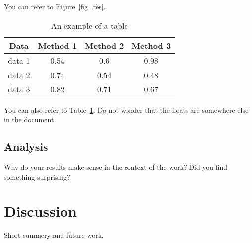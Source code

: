 \documentclass[a4paper,12pt]{article}
\begin{document}
You can refer to Figure~\ref{fig_res}.
\begin{table}[h]
\caption{An example of a table}
\label{tab_example}
\centering
\begin{tabular}{c||c|c|c}
Data & Method 1 & Method 2 & Method 3\\
\hline\hline
data 1 &0.54 & 0.6& 0.98\\
\hline
data 2 &0.74 & 0.54& 0.48\\
\hline
data 3 &0.82 & 0.71& 0.67
\end{tabular}
\end{table}
You can also refer to Table~\ref{tab_example}. Do not wonder that the floats are somewhere else in the document.

\subsection{Analysis}
Why do your results make sense in the context of the work? Did you find something surprising?

\section{Discussion}
Short summery and future work.
\end{document}
